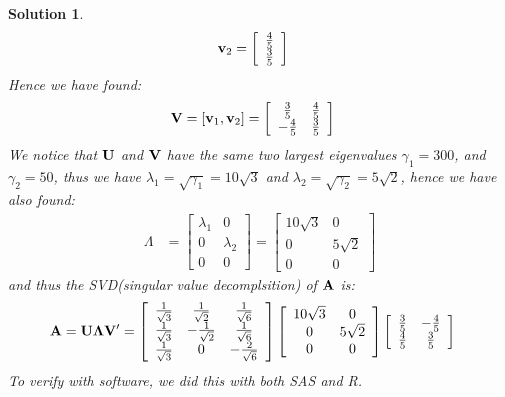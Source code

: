 \documentclass[11pt]{article}
\newtheorem{sol}{Solution}
\begin{document}
\begin{sol}
\begin{align*}
	 	{\bf v}_2 &= \left[\begin{array}{c} \frac{4}{5} \\ \frac{3}{5} \end{array}\right]
	 \end{align*}
	 Hence we have found:
	 \begin{align*}
	 	{\bf V} &= \left[{\bf v}_1, {\bf v}_2\right] = \left[\begin{array}{cc} \frac{3}{5}&\frac{4}{5} \\ -\frac{4}{5}&\frac{3}{5} \end{array}\right]
	 \end{align*}
	 We notice that ${\bf U}$ and ${\bf V}$ have the same two largest eigenvalues $\gamma_1 = 300$, and $\gamma_2 = 50$, thus we have $\lambda_1 = \sqrt{\gamma_1} = 10\sqrt{3}$ and $\lambda_2 = \sqrt{\gamma_2} = 5\sqrt{2}$, hence we have also found:
	 \begin{align*}
	 	\Lambda &=\left[\begin{array}{cc} \lambda_1&0 \\ 0&\lambda_2 \\0 &0 \end{array}\right] =  \left[\begin{array}{cc} 10\sqrt{3}&0 \\ 0&5\sqrt{2} \\ 0&0 \end{array}\right]
	 \end{align*}
	 and thus the SVD(singular value decomplsition) of ${\bf A}$ is:
	 \begin{align*}
	 	{\bf A} &= {\bf U}{\bf \Lambda}{\bf V}' =  \left[\begin{array}{ccc} \frac{1}{\sqrt{3}}&\frac{1}{\sqrt{2}}&\frac{1}{\sqrt{6}}\\ \frac{1}{\sqrt{3}}&-\frac{1}{\sqrt{2}}& \frac{1}{\sqrt{6}}\\\frac{1}{\sqrt{3}}&0&-\frac{2}{\sqrt{6}}\end{array}\right]\left[\begin{array}{cc} 10\sqrt{3}&0 \\ 0&5\sqrt{2} \\ 0&0 \end{array}\right] \left[\begin{array}{cc} \frac{3}{5}&-\frac{4}{5} \\ \frac{4}{5}&\frac{3}{5} \end{array}\right]
	 \end{align*}
	 To verify with software, we did this with both SAS and R.\vskip 2mm

\end{sol}
\end{document}
